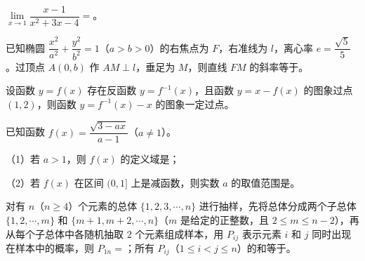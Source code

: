 \begin{question}
$\lim\limits_{x\to1}\dfrac{x-1}{x^2+3x-4}=$\gkblank{}。

\end{question}
\begin{question}
已知椭圆 $\dfrac{x^2}{a^2}+\dfrac{y^2}{b^2}=1$（$a>b>0$）的右焦点为 $F$，右准线为 $l$，离心率 $e=\dfrac{\sqrt5}5$。过顶点 $A(0,b)$ 作 $AM\perp l$，垂足为 $M$，则直线 $FM$ 的斜率等于\gkblank{}。

\end{question}
\begin{question}
设函数 $y=f(x)$ 存在反函数 $y=f^{-1}(x)$，且函数 $y=x-f(x)$ 的图象过点 $(1,2)$，则函数 $y=f^{-1}(x)-x$ 的图象一定过点\gkblank{}。

\end{question}
\begin{question}
已知函数 $f(x)=\dfrac{\sqrt{3-ax}}{a-1}$（$a\neq1$）。

（1）若 $a>1$，则 $f(x)$ 的定义域是\gkblank{}；

（2）若 $f(x)$ 在区间 $(0,1]$ 上是减函数，则实数 $a$ 的取值范围是\gkblank{}。

\end{question}
\begin{question}
对有 $n$（$n\geqslant4$）个元素的总体 $\{1,2,3,\cdots,n\}$ 进行抽样，先将总体分成两个子总体 $\{1,2,\cdots,m\}$ 和 $\{m+1,m+2,\cdots,n\}$（$m$ 是给定的正整数，且 $2\leqslant m\leqslant n-2$），再从每个子总体中各随机抽取 $2$ 个元素组成样本，用 $P_{ij}$ 表示元素 $i$ 和 $j$ 同时出现在样本中的概率，则 $P_{1n}=$\gkblank{}；所有 $P_{ij}$（$1\leqslant i<j\leqslant n$）的和等于\gkblank{}。

\end{question}

